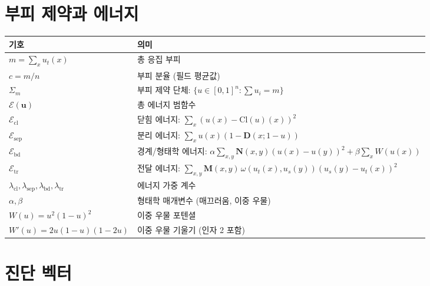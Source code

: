\section*{부피 제약과 에너지}

\begin{tabular}{lp{11cm}}
\hline
\textbf{기호} & \textbf{의미} \\
\hline
$m = \sum_{x} u_t(x)$ & 총 응집 부피 \\
$c = m/n$ & 부피 분율 (필드 평균값) \\
$\Sigma_m$ & 부피 제약 단체: $\{u \in [0,1]^n : \sum u_i = m\}$ \\[6pt]
$\mathcal{E}(\mathbf{u})$ & 총 에너지 범함수 \\
$\mathcal{E}_{\mathrm{cl}}$ & 닫힘 에너지: $\sum_x (u(x) - \mathrm{Cl}(u)(x))^2$ \\
$\mathcal{E}_{\mathrm{sep}}$ & 분리 에너지: $\sum_x u(x)(1 - \mathbf{D}(x; 1-u))$ \\
$\mathcal{E}_{\mathrm{bd}}$ & 경계/형태학 에너지: $\alpha \sum_{x,y} \mathbf{N}(x,y)(u(x)-u(y))^2 + \beta \sum_x W(u(x))$ \\
$\mathcal{E}_{\mathrm{tr}}$ & 전달 에너지: $\sum_{x,y} \mathbf{M}(x,y)\, \omega(u_t(x), u_s(y))(u_s(y) - u_t(x))^2$ \\[6pt]
$\lambda_{\mathrm{cl}}, \lambda_{\mathrm{sep}}, \lambda_{\mathrm{bd}}, \lambda_{\mathrm{tr}}$ & 에너지 가중 계수 \\
$\alpha, \beta$ & 형태학 매개변수 (매끄러움, 이중 우물) \\
$W(u) = u^2(1-u)^2$ & 이중 우물 포텐셜 \\
$W'(u) = 2u(1-u)(1-2u)$ & 이중 우물 기울기 (인자 2 포함) \\
\hline
\end{tabular}


\section*{진단 벡터}


